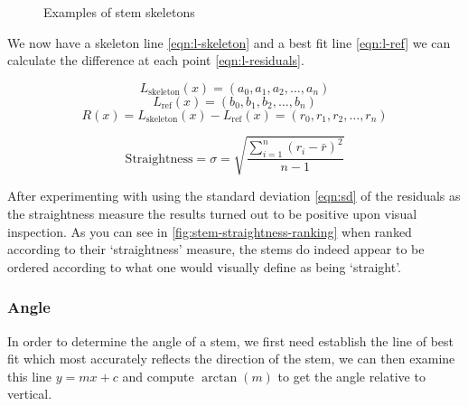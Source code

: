 \begin{figure}[h!]
    \caption{Examples of stem skeletons}
    \label{fig:stem-skeletons}
\end{figure}

We now have a skeleton line \cref{eqn:l-skeleton} and a best fit line \cref{eqn:l-ref} we can calculate the difference at each point \cref{eqn:l-residuals}.

\begin{equation} \label{eqn:l-skeleton}
    L_{\text{skeleton}}(x) = (a_0, a_1, a_2, \ldots, a_n)
\end{equation}
\begin{equation} \label{eqn:l-ref}
    L_{\text{ref}}(x) = (b_0, b_1, b_2, \ldots, b_n)
\end{equation}
\begin{equation} \label{eqn:l-residuals}
    R(x) = L_{\text{skeleton}}(x) - L_{\text{ref}}(x) = (r_0, r_1, r_2, \ldots, r_n)
\end{equation}

\begin{equation} \label{eqn:sd}
\text{Straightness} = \sigma = \sqrt{\frac{\sum\limits_{i=1}^{n}\left(r_{i} - \bar{r}\right)^{2}}{n-1}}
\end{equation}

After experimenting with using the standard deviation \cref{eqn:sd} of the residuals as the straightness measure the results turned out to be positive upon visual inspection. As you can see in \cref{fig:stem-straightness-ranking} when ranked according to their `straightness' measure, the stems do indeed appear to be ordered according to what one would visually define as being `straight'.



\subsubsection{Angle}

In order to determine the angle of a stem, we first need establish the line of best fit which most accurately reflects the direction of the stem, we can then examine this line $y = mx + c$ and compute $\arctan(m)$ to get the angle relative to vertical.

